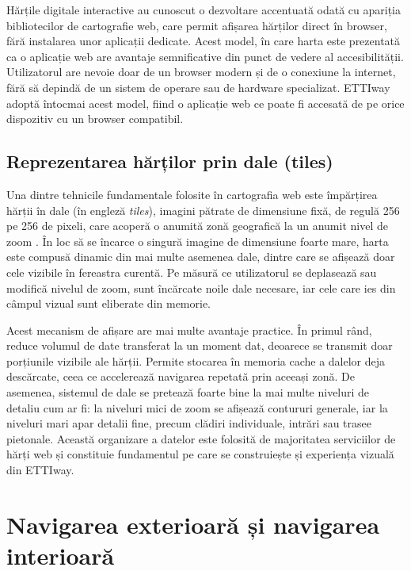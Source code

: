 Hărțile digitale interactive au cunoscut o dezvoltare accentuată odată cu
apariția bibliotecilor de cartografie web, care permit afișarea hărților direct
în browser, fără instalarea unor aplicații dedicate. Acest model, în care harta
este prezentată ca o aplicație web are avantaje semnificative din punct de
vedere al accesibilității. Utilizatorul are nevoie doar de un browser modern și
de o conexiune la internet, fără să depindă de un sistem de operare sau de hardware
specializat. ETTIway adoptă întocmai acest model, fiind o aplicație web ce poate
fi accesată de pe orice dispozitiv cu un browser compatibil.

\subsection{Reprezentarea hărților prin dale (tiles)}
\label{subsec:tiles}

Una dintre tehnicile fundamentale folosite în cartografia web este împărțirea
hărții în dale (în engleză \textit{tiles}), imagini pătrate de dimensiune fixă,
de regulă 256 pe 256 de pixeli, care acoperă o anumită zonă geografică la un
anumit nivel de zoom \cite{OSMTileNames}. În loc să se încarce o singură imagine de dimensiune
foarte mare, harta este compusă dinamic din mai multe asemenea dale, dintre care
se afișează doar cele vizibile în fereastra curentă. Pe măsură ce utilizatorul
se deplasează sau modifică nivelul de zoom, sunt încărcate noile dale necesare,
iar cele care ies din câmpul vizual sunt eliberate din memorie.

Acest mecanism de afișare are mai multe avantaje practice. În primul rând,
reduce volumul de date transferat la un moment dat, deoarece se transmit doar
porțiunile vizibile ale hărții. Permite stocarea în memoria
cache a dalelor deja descărcate, ceea ce accelerează navigarea repetată prin
aceeași zonă. De asemenea, sistemul de dale se pretează foarte bine la
mai multe niveluri de detaliu cum ar fi: la niveluri mici de zoom se afișează contururi
generale, iar la niveluri mari apar detalii fine, precum clădiri individuale,
intrări sau trasee pietonale. Această organizare a datelor este
folosită de majoritatea serviciilor de hărți web și constituie fundamentul pe
care se construiește și experiența vizuală din ETTIway.

\section{Navigarea exterioară și navigarea interioară}
\label{sec:exterior-interior}

